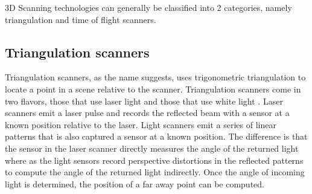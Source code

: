 3D Scanning technologies can generally be classified into 2 categories, namely triangulation and time of flight scanners.

\subsection{Triangulation scanners}

Triangulation scanners, as the name suggests, uses trigonometric triangulation \cite{Frohlich2004} to locate a point in a scene relative to the scanner. Triangulation scanners come in two flavors, those that use laser light and those that use white light \cite{Brown2012}. Laser scanners emit a laser pulse and records the reflected beam with a sensor at a known position relative to the laser. Light scanners emit a series of linear patterns that is also captured a sensor at a known position. The difference is that the sensor in the laser scanner directly measures the angle of the returned light where as the light sensors record perspective distortions in the reflected patterns to compute the angle of the returned light indirectly. Once the angle of incoming light is determined, the position of a far away point can be computed.

